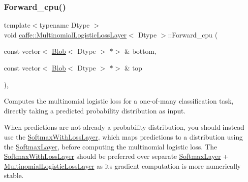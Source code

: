 \subsubsection{\texorpdfstring{Forward\+\_\+cpu()}{Forward\_cpu()}\hspace{0.1cm}{\footnotesize\ttfamily [1/2]}}
{\footnotesize\ttfamily template$<$typename Dtype $>$ \\
void \mbox{\hyperlink{classcaffe_1_1_multinomial_logistic_loss_layer}{caffe\+::\+Multinomial\+Logistic\+Loss\+Layer}}$<$ Dtype $>$\+::Forward\+\_\+cpu (\begin{DoxyParamCaption}\item[{const vector$<$ \mbox{\hyperlink{classcaffe_1_1_blob}{Blob}}$<$ Dtype $>$ $\ast$$>$ \&}]{bottom,  }\item[{const vector$<$ \mbox{\hyperlink{classcaffe_1_1_blob}{Blob}}$<$ Dtype $>$ $\ast$$>$ \&}]{top }\end{DoxyParamCaption})\hspace{0.3cm}{\ttfamily [protected]}, {\ttfamily [virtual]}}



Computes the multinomial logistic loss for a one-\/of-\/many classification task, directly taking a predicted probability distribution as input. 

When predictions are not already a probability distribution, you should instead use the \mbox{\hyperlink{classcaffe_1_1_softmax_with_loss_layer}{Softmax\+With\+Loss\+Layer}}, which maps predictions to a distribution using the \mbox{\hyperlink{classcaffe_1_1_softmax_layer}{Softmax\+Layer}}, before computing the multinomial logistic loss. The \mbox{\hyperlink{classcaffe_1_1_softmax_with_loss_layer}{Softmax\+With\+Loss\+Layer}} should be preferred over separate \mbox{\hyperlink{classcaffe_1_1_softmax_layer}{Softmax\+Layer}} + \mbox{\hyperlink{classcaffe_1_1_multinomial_logistic_loss_layer}{Multinomial\+Logistic\+Loss\+Layer}} as its gradient computation is more numerically stable.



